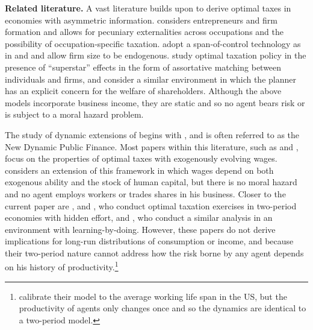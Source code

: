 \documentclass[11pt]{article}
\theoremstyle{plain}
\begin{document}


\textbf{Related literature.} A vast literature builds upon \cite{mirrlees_exploration_1971} to derive optimal taxes in economies with asymmetric information. \cite{scheuer_entrepreneurial_2014} considers entrepreneurs and firm formation and allows for pecuniary externalities across occupations and the possibility of occupation-specific taxation. \cite{ales_taxing_2017} adopt a span-of-control technology as in \cite{rosen_authority_1982} and \cite{lucas_size_1978} and allow firm size to be endogenous. \cite{scheuer_taxation_2017} study optimal taxation policy in the presence of ``superstar'' effects in the form of assortative matching between individuals and firms, and \cite{ales_taxing_2016} consider a similar environment in which the planner has an explicit concern for the welfare of shareholders. Although the above models incorporate business income, they are static and so no agent bears risk or is subject to a moral hazard problem. 

The study of dynamic extensions of \cite{mirrlees_exploration_1971} begins with \cite{golosov_optimal_2003}, and is often referred to as the New Dynamic Public Finance. Most papers within this literature, such as \cite{golosov_redistribution_2016} and \cite{farhi_insurance_2013}, focus on the properties of optimal taxes with exogenously evolving wages. \cite{stantcheva_optimal_2017} considers an extension of this framework in which wages depend on both exogenous ability and the stock of human capital, but there is no moral hazard and no agent employs workers or trades shares in his business. Closer to the current paper are \cite{albanesi_optimal_2006}, \cite{kapicka_optimal_2019} and \cite{best_optimal_2012}, who conduct optimal taxation exercises in two-period economies with hidden effort, and \cite{makris_taxation_2021}, who conduct a similar analysis in an environment with learning-by-doing. However, these papers do not derive implications for long-run distributions of consumption or income, and because their two-period nature cannot address how the risk borne by any agent depends on his history of productivity.\footnote{\cite{makris_taxation_2021} calibrate their model to the average working life span in the US, but the productivity of agents only changes once and so the dynamics are identical to a two-period model.} 
\end{document}
